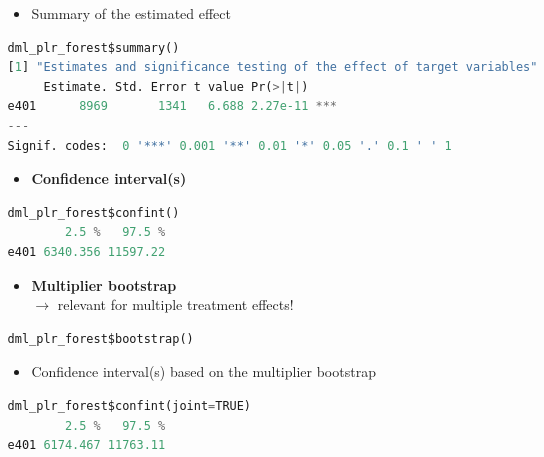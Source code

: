 \begin{frame}[fragile]
\begin{columns}
\begin{column}{0.3\textwidth}
\end{column}
\begin{column}{0.7\textwidth}
\begin{itemize}
\item Summary of the estimated effect
\end{itemize}
{\tiny
\begin{lstlisting}[language=Python,
backgroundcolor = \color{gray!20},
keywordstyle=\color{OliveGreen}, stringstyle=\color{BrickRed}]
dml_plr_forest$summary()
[1] "Estimates and significance testing of the effect of target variables"
     Estimate. Std. Error t value Pr(>|t|)    
e401      8969       1341   6.688 2.27e-11 ***
---
Signif. codes:  0 '***' 0.001 '**' 0.01 '*' 0.05 '.' 0.1 ' ' 1

\end{lstlisting}
}
\begin{itemize}
\item \textbf{Confidence interval(s)}
\end{itemize}
{\tiny
\begin{lstlisting}[language=Python,
backgroundcolor = \color{gray!20},
keywordstyle=\color{OliveGreen}, stringstyle=\color{BrickRed}]
dml_plr_forest$confint()
        2.5 %   97.5 %
e401 6340.356 11597.22
\end{lstlisting}
}
\begin{itemize}
\item \textbf{Multiplier bootstrap} \\
$\rightarrow$ relevant for multiple treatment effects!
\end{itemize}
{\tiny
\begin{lstlisting}[language=Python,
backgroundcolor = \color{gray!20},
keywordstyle=\color{OliveGreen}, stringstyle=\color{BrickRed}]
dml_plr_forest$bootstrap()
\end{lstlisting}
}
\begin{itemize}
\item Confidence interval(s) based on the multiplier bootstrap
\end{itemize}
{\tiny
\begin{lstlisting}[language=Python,
backgroundcolor = \color{gray!20},
keywordstyle=\color{OliveGreen}, stringstyle=\color{BrickRed}]
dml_plr_forest$confint(joint=TRUE)
        2.5 %   97.5 %
e401 6174.467 11763.11
\end{lstlisting}
}
\end{column}
\end{columns}
\end{frame}


